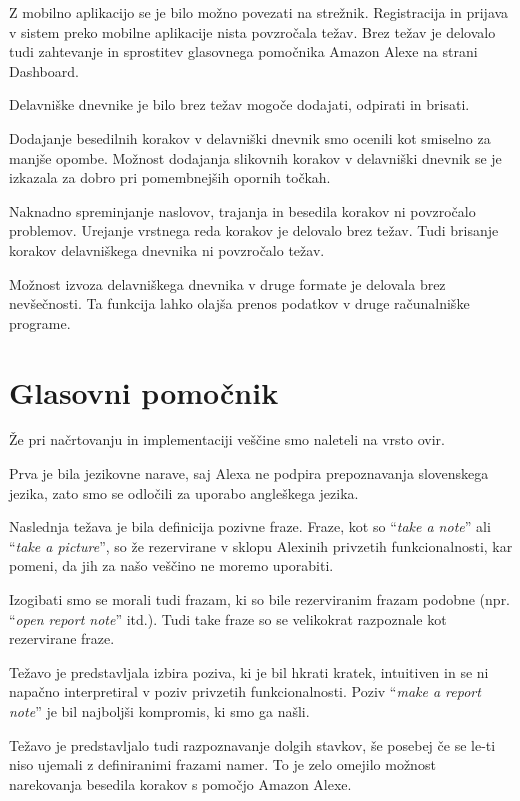 \documentclass[a4paper, 12pt]{book}
\begin{document}
Z mobilno aplikacijo se je bilo možno povezati na strežnik.
Registracija in prijava v sistem preko mobilne aplikacije nista povzročala težav.
Brez težav je delovalo tudi zahtevanje in sprostitev glasovnega pomočnika Amazon Alexe na strani Dashboard.

Delavniške dnevnike je bilo brez težav mogoče dodajati, odpirati in brisati.

Dodajanje besedilnih korakov v delavniški dnevnik smo ocenili kot smiselno za manjše opombe.
Možnost dodajanja slikovnih korakov v delavniški dnevnik se je izkazala za dobro pri pomembnejših opornih točkah.

Naknadno spreminjanje naslovov, trajanja in besedila korakov ni povzročalo problemov.
Urejanje vrstnega reda korakov je delovalo brez težav.
Tudi brisanje korakov delavniškega dnevnika ni povzročalo težav.

Možnost izvoza delavniškega dnevnika v druge formate je delovala brez nevšečnosti.
Ta funkcija lahko olajša prenos podatkov v druge računalniške programe.

\section{Glasovni pomočnik}

Že pri načrtovanju in implementaciji veščine smo naleteli na vrsto ovir.

Prva je bila jezikovne narave, saj Alexa ne podpira prepoznavanja slovenskega jezika, zato smo se odločili za uporabo angleškega jezika.

Naslednja težava je bila definicija pozivne fraze.
Fraze, kot so \enquote{\textit{take a note}} ali \enquote{\textit{take a picture}}, so že rezervirane v sklopu Alexinih privzetih funkcionalnosti, kar pomeni, da jih za našo veščino ne moremo uporabiti.

Izogibati smo se morali tudi frazam, ki so bile rezerviranim frazam podobne (npr. \enquote{\textit{open report note}} itd.).
Tudi take fraze so se velikokrat razpoznale kot rezervirane fraze.

Težavo je predstavljala izbira poziva, ki je bil hkrati kratek, intuitiven in se ni napačno interpretiral v poziv privzetih funkcionalnosti.
Poziv \enquote{\textit{make a report note}} je bil najboljši kompromis, ki smo ga našli.

Težavo je predstavljalo tudi razpoznavanje dolgih stavkov, še posebej če se le-ti niso ujemali z definiranimi frazami namer.
To je zelo omejilo možnost narekovanja besedila korakov s pomočjo Amazon Alexe.
\end{document}
